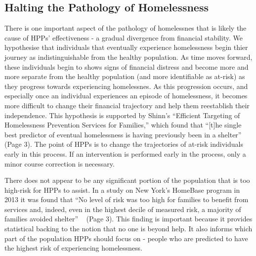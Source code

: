 \documentclass[10pt,letterpaper]{article}
\begin{document}
\subsection*{Halting the Pathology of Homelessness}
There is one important aspect of the pathology of homelessnes that is likely the cause of HPPs' effectiveness - a gradual divergence from financial stability. We hypothesise that individuals that eventually experience homelessness begin thier journey as indistinguishable from the healthy population. As time moves forward, these individuals begin to shows signs of financial distress and become more and more separate from the healthy population (and more identifiable as at-risk) as they progress towards experiencing homelessnes. As this progression occurs, and especially once an individual experiences an episode of homelessness, it becomes more difficult to change their financial trajectory and help them reestablish their independence. This hypothesis is supported by Shinn's ``Efficient Targeting of Homelessness Prevention Services for Families,'' which found that ``[t]he single best predictor of eventual homelessness is having previously been in a shelter'' ~\cite{shinn2019homelessness} (Page 3). The point of HPPs is to change the trajectories of at-risk individuals early in this process. If an intervention is performed early in the process, only a minor course correction is necessary. 

There does not appear to be any significant portion of the population that is too high-risk for HPPs to assist. In a study on New York's HomeBase program in 2013 it was found that ``No level of risk was too high for families to benefit from services and, indeed, even in the highest decile of measured risk, a majority of families avoided shelter'' ~\cite{shinn2013efficient} (Page 3). This finding is important because it provides statistical backing to the notion that no one is beyond help. It also informs which part of the population HPPs should focus on - people who are predicted to have the highest risk of experiencing homelessness.
\end{document}

